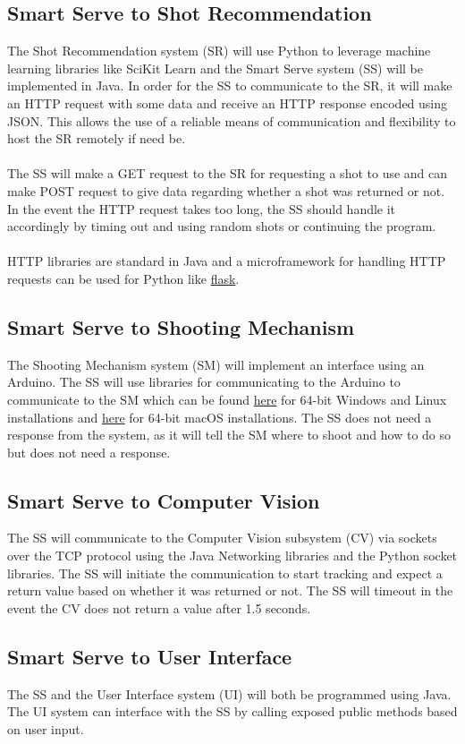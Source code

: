 \documentclass[11pt]{article}
\begin{document}
\subsection{Smart Serve to Shot Recommendation}
The Shot Recommendation system (SR) will use Python to leverage machine learning libraries like SciKit Learn and the Smart Serve system (SS) will be implemented in Java. In order for the SS to communicate to the SR, it will make an HTTP request with some data and receive an HTTP response encoded using JSON. This allows the use of a reliable means of communication and flexibility to host the SR remotely if need be. \\ \\
The SS will make a GET request to the SR for requesting a shot to use and can make POST request to give data regarding whether a shot was returned or not. In the event the HTTP request takes too long, the SS should handle it accordingly by timing out and using random shots or continuing the program. \\ \\
HTTP libraries are standard in Java and a microframework for handling HTTP requests can be used for Python like \href{http://flask.pocoo.org}{flask}.
\subsection{Smart Serve to Shooting Mechanism}
The Shooting Mechanism system (SM) will implement an interface using an Arduino. The SS will use libraries for communicating to the Arduino to communicate to the SM which can be found \href{http://fizzed.com/oss/rxtx-for-java}{here} for 64-bit Windows and Linux installations and \href{http://blog.iharder.net/2009/08/18/rxtx-java-6-and-librxtxserial-jnilib-on-intel-mac-os-x/}{here} for 64-bit macOS installations. The SS does not need a response from the system, as it will tell the SM where to shoot and how to do so but does not need a response.
\subsection{Smart Serve to Computer Vision}
The SS will communicate to the Computer Vision subsystem (CV) via sockets over the TCP protocol using the Java Networking libraries and the Python socket libraries. The SS will initiate the communication to start tracking and expect a return value based on whether it was returned or not. The SS will timeout in the event the CV does not return a value after 1.5 seconds.
\subsection{Smart Serve to User Interface}
The SS and the User Interface system (UI) will both be programmed using Java. The UI system can interface with the SS by calling exposed public methods based on user input.
\end{document}
